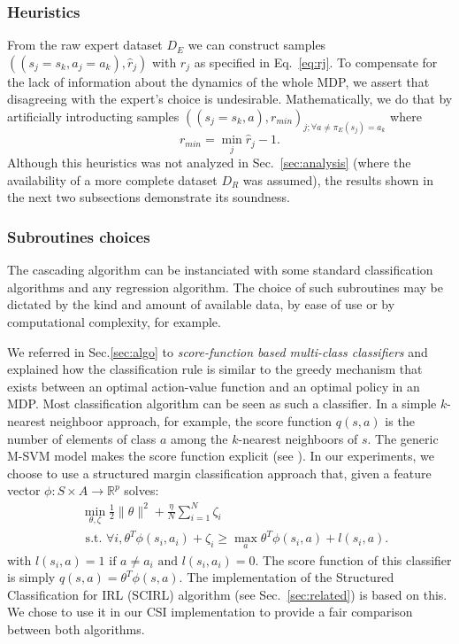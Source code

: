 \documentclass[smallextended]{svjour3}
\begin{document}
\subsubsection{Heuristics}
\label{subsubsec:heuristics}
From the raw expert dataset $D_E$ we can construct samples $((s_j=s_k,a_j=a_k),\hat r_j)$ with $\hat r_j$ as specified in Eq.~\eqref{eq:rj}. To compensate for the lack of information about the dynamics of the whole MDP, we assert that disagreeing with the expert's choice is undesirable. Mathematically, we do that by artificially introducting samples $((s_j=s_k,a),r_{min})_{j;\forall a\neq \pi_E(s_j) = a_k}$ where
\begin{equation}
  r_{min} = \min_j\hat r_j - 1.
\end{equation}
Although this heuristics was not analyzed in Sec.~\ref{sec:analysis} (where the availability of a more complete dataset $D_R$ was assumed), the results shown in the next two subsections demonstrate its soundness.
\subsubsection{Subroutines choices}
\label{subsubsec:subroutines}
The cascading algorithm can be instanciated with some standard classification algorithms and any regression algorithm. The choice of such subroutines may be dictated by the kind and amount of available data, by ease of use or by computational complexity, for example.

We referred in Sec.\ref{sec:algo} to \emph{score-function based multi-class classifiers} and explained how the classification rule is similar to the greedy mechanism that exists between an optimal action-value function and an optimal policy in an MDP. Most classification algorithm can be seen as such a classifier. In a simple $k$-nearest neighboor approach, for example, the score function $q(s,a)$ is the number of elements of class $a$ among the $k$-nearest neighboors of $s$. The generic M-SVM model makes the score function explicit (see \cite{guermeur2011generic}). In our experiments, we choose to use a structured margin classification approach \cite{taskar2005learning} that, given a feature vector $\phi: S\times A \rightarrow \mathbb{R}^p$ solves:
\begin{eqnarray*}
  &\min_{\theta,\zeta}\frac{1}{2}\|\theta\|^2 +
  \frac{\eta}{N}\sum_{i=1}^N \zeta_i \\
  &\text{~s.t.~} \forall i,
  \theta^T{\phi}(s_i,a_i)+\zeta_i \geq \max_a \theta^T
  {\phi}(s_i,a) + l(s_i,a). \label{eq:qp_taskar}
\end{eqnarray*}
with $l(s_i,a) = 1\textrm{ if } a\neq a_i \textrm{ and } l(s_i,a_i)=0$. The score function of this classifier is simply $q(s,a) = \theta^T \phi(s,a)$. The implementation of the Structured Classification for IRL (SCIRL) algorithm \cite{klein2012scirl} (see Sec.~\ref{sec:related}) is based on this. We chose to use it in our CSI implementation to provide a fair comparison between both algorithms.
\end{document}
